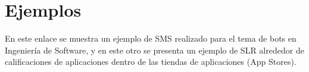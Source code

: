 \section{Ejemplos}
En este enlace \cite{ejemplo_sms} se muestra un ejemplo de SMS realizado para el tema de bots en Ingeniería de Software, y en este otro \cite{ejemplo_slr} se presenta un ejemplo de SLR alrededor de calificaciones de aplicaciones dentro de las tiendas de aplicaciones (App Stores). \\